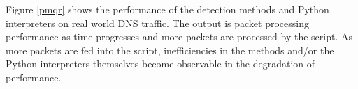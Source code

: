 \documentclass{llncs}
\begin{document}
\begin{figure}
\centering
{}
\end{figure}

Figure \ref{pmqr} shows the performance of the detection methods and Python
interpreters on real world DNS traffic. The output is packet processing performance as time
progresses and more packets are processed by the script. As more packets are fed
into the script, inefficiencies in the methods and/or the Python interpreters
themselves become observable in the degradation of performance.


\end{document}
